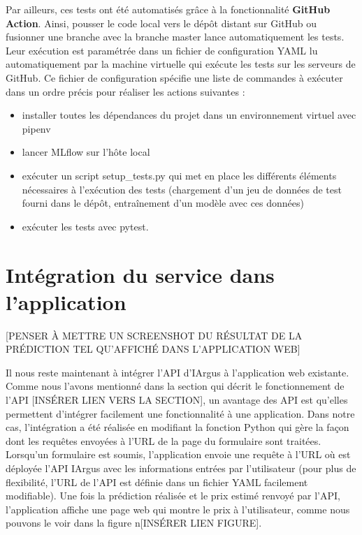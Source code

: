 \documentclass[french]{article}
\begin{document}
    Par ailleurs, ces tests ont été automatisés grâce à la fonctionnalité \textbf{GitHub Action}. Ainsi, pousser le code local vers le dépôt distant sur GitHub ou fusionner une branche avec la branche master lance automatiquement les tests. Leur exécution est paramétrée dans un fichier de configuration YAML lu automatiquement par la machine virtuelle qui exécute les tests sur les serveurs de GitHub. Ce fichier de configuration spécifie une liste de commandes à exécuter dans un ordre précis pour réaliser les actions suivantes :
    \begin{itemize}
        \item installer toutes les dépendances du projet dans un environnement virtuel avec pipenv
        \item lancer MLflow sur l'hôte local
        \item exécuter un script setup\_tests.py qui met en place les différents éléments nécessaires à l'exécution des tests (chargement d'un jeu de données de test fourni dans le dépôt, entraînement d'un modèle avec ces données)
        \item exécuter les tests avec pytest.
    \end{itemize}


    \section{Intégration du service dans l'application}

    [PENSER À METTRE UN SCREENSHOT DU RÉSULTAT DE LA PRÉDICTION TEL QU'AFFICHÉ DANS L'APPLICATION WEB]

    Il nous reste maintenant à intégrer l'API d'IArgus à l'application web existante. Comme nous l'avons mentionné dans la section qui décrit le fonctionnement de l'API [INSÉRER LIEN VERS LA SECTION], un avantage des API est qu'elles permettent d'intégrer facilement une fonctionnalité à une application. Dans notre cas, l'intégration a été réalisée en modifiant la fonction Python qui gère la façon dont les requêtes envoyées à l'URL de la page du formulaire sont traitées. Lorsqu'un formulaire est soumis, l'application envoie une requête à l'URL où est déployée l'API IArgus avec les informations entrées par l'utilisateur (pour plus de flexibilité, l'URL de l'API est définie dans un fichier YAML facilement modifiable). Une fois la prédiction réalisée et le prix estimé renvoyé par l'API, l'application affiche une page web qui montre le prix à l'utilisateur, comme nous pouvons le voir dans la figure n[INSÉRER LIEN FIGURE].
\end{document}
